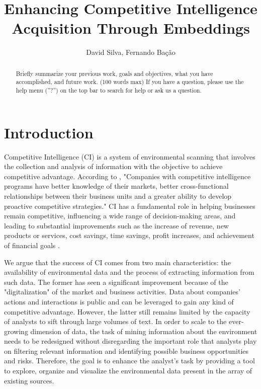 \documentclass[a4paper]{article}
\title{Enhancing Competitive Intelligence Acquisition Through Embeddings}
\author{David Silva, Fernando Bação}
\date{}
\begin{document}
\maketitle

\begin{abstract}
	Briefly summarize your previous work, goals and objectives, what you have accomplished, and future work. (100 words max) If you have a question, please use the help menu (''?'') on the top bar to search for help or ask us a question.
\end{abstract}

\section*{Introduction}
Competitive Intelligence (CI) is a system of environmental scanning that involves the collection and analysis of information with the objective to achieve competitive advantage. According to \citet{brod1999}, "Companies with competitive intelligence programs have better knowledge of their markets, better cross-functional relationships between their business units and a greater ability to develop proactive competitive strategies." CI has a fundamental role in helping businesses remain competitive, influencing a wide range of decision-making areas, and leading to substantial improvements such as the increase of revenue, new products or services, cost savings, time savings, profit increases, and achievement of financial goals \citep{calof2017}.

We argue that the success of CI comes from two main characteristics: the availability of environmental data and the process of extracting information from such data. The former has seen a significant improvement because of the "digitalization" of the market and business activities. Data about companies' actions and interactions is public and can be leveraged to gain any kind of competitive advantage. However, the latter still remains limited by the capacity of analysts to sift through large volumes of text. In order to scale to the ever-growing dimension of data, the task of mining information about the environment needs to be redesigned without disregarding the important role that analysts play on filtering relevant information and identifying possible business opportunities and risks. Therefore, the goal is to enhance the analyst's task by providing a tool to explore, organize and visualize the environmental data present in the array of existing sources.
\end{document}
